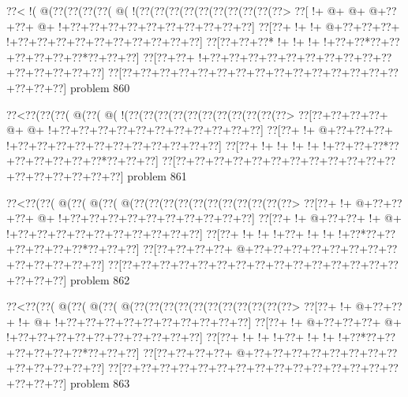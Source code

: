 \vbox{\vbox{\goo
\0??<\- !(\- @(\0??(\0??(\0??(\0??(\- @(\- !(\0??(\0??(\0??(\0??(\0??(\0??(\0??(\0??(\0??(\0??>
\0??[\- !+\- @+\- @+\- @+\0??+\0??+\- @+\- !+\0??+\0??+\0??+\0??+\0??+\0??+\0??+\0??+\0??+\0??]
\0??[\0??+\- !+\- !+\- @+\0??+\0??+\0??+\- !+\0??+\0??+\0??+\0??+\0??+\0??+\0??+\0??+\0??+\0??]
\0??[\0??+\0??+\0??*\- !+\- !+\- !+\- !+\0??+\0??*\0??+\0??+\0??+\0??+\0??+\0??*\0??+\0??+\0??]
\0??[\0??+\0??+\- !+\0??+\0??+\0??+\0??+\0??+\0??+\0??+\0??+\0??+\0??+\0??+\0??+\0??+\0??+\0??]
\0??[\0??+\0??+\0??+\0??+\0??+\0??+\0??+\0??+\0??+\0??+\0??+\0??+\0??+\0??+\0??+\0??+\0??+\0??]
}
\hfil problem 860\hfil\break
}



\vbox{\vbox{\goo
\0??<\0??(\0??(\0??(\- @(\0??(\- @(\- !(\0??(\0??(\0??(\0??(\0??(\0??(\0??(\0??(\0??(\0??(\0??>
\0??[\0??+\0??+\0??+\0??+\- @+\- @+\- !+\0??+\0??+\0??+\0??+\0??+\0??+\0??+\0??+\0??+\0??+\0??]
\0??[\0??+\- !+\- @+\0??+\0??+\0??+\- !+\0??+\0??+\0??+\0??+\0??+\0??+\0??+\0??+\0??+\0??+\0??]
\0??[\0??+\- !+\- !+\- !+\- !+\- !+\0??+\0??+\0??*\0??+\0??+\0??+\0??+\0??+\0??*\0??+\0??+\0??]
\0??[\0??+\0??+\0??+\0??+\0??+\0??+\0??+\0??+\0??+\0??+\0??+\0??+\0??+\0??+\0??+\0??+\0??+\0??]
}
\hfil problem 861\hfil\break
}



\vbox{\vbox{\goo
\0??<\0??(\0??(\- @(\0??(\- @(\0??(\- @(\0??(\0??(\0??(\0??(\0??(\0??(\0??(\0??(\0??(\0??(\0??>
\0??[\0??+\- !+\- @+\0??+\0??+\0??+\- @+\- !+\0??+\0??+\0??+\0??+\0??+\0??+\0??+\0??+\0??+\0??]
\0??[\0??+\- !+\- @+\0??+\0??+\- !+\- @+\- !+\0??+\0??+\0??+\0??+\0??+\0??+\0??+\0??+\0??+\0??]
\0??[\0??+\- !+\- !+\- !+\0??+\- !+\- !+\- !+\0??*\0??+\0??+\0??+\0??+\0??+\0??*\0??+\0??+\0??]
\0??[\0??+\0??+\0??+\0??+\- @+\0??+\0??+\0??+\0??+\0??+\0??+\0??+\0??+\0??+\0??+\0??+\0??+\0??]
\0??[\0??+\0??+\0??+\0??+\0??+\0??+\0??+\0??+\0??+\0??+\0??+\0??+\0??+\0??+\0??+\0??+\0??+\0??]
}
\hfil problem 862\hfil\break
}



\vbox{\vbox{\goo
\0??<\0??(\0??(\- @(\0??(\- @(\0??(\- @(\0??(\0??(\0??(\0??(\0??(\0??(\0??(\0??(\0??(\0??(\0??>
\0??[\0??+\- !+\- @+\0??+\0??+\- !+\- @+\- !+\0??+\0??+\0??+\0??+\0??+\0??+\0??+\0??+\0??+\0??]
\0??[\0??+\- !+\- @+\0??+\0??+\0??+\- @+\- !+\0??+\0??+\0??+\0??+\0??+\0??+\0??+\0??+\0??+\0??]
\0??[\0??+\- !+\- !+\- !+\0??+\- !+\- !+\- !+\0??*\0??+\0??+\0??+\0??+\0??+\0??*\0??+\0??+\0??]
\0??[\0??+\0??+\0??+\0??+\- @+\0??+\0??+\0??+\0??+\0??+\0??+\0??+\0??+\0??+\0??+\0??+\0??+\0??]
\0??[\0??+\0??+\0??+\0??+\0??+\0??+\0??+\0??+\0??+\0??+\0??+\0??+\0??+\0??+\0??+\0??+\0??+\0??]
}
\hfil problem 863\hfil\break
}



